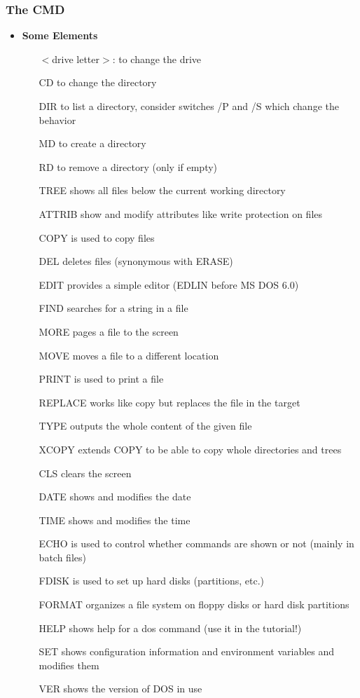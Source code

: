 \documentclass[twocolumn]{article}
\begin{document}
		\subsubsection{The CMD}
			\begin{itemize}
				\item \textbf{Some Elements}
			\begin{itemize}
		\item[$<$drive letter$>$:] to change the drive
		\item[CD] to change the directory
		\item[DIR] to list a directory, consider switches /P and /S which change the behavior
		\item[MD] to create a directory
		\item[RD] to remove a directory (only if empty)
		\item[TREE] shows all files below the current working directory
		\item[ATTRIB] show and modify attributes like write protection on files
		\item[COPY] is used to copy files
		\item[DEL] deletes files (synonymous with ERASE)
		\item[EDIT] provides a simple editor (EDLIN before MS DOS 6.0)
		\item[FIND] searches for a string in a file
		\item[MORE] pages a file to the screen	
		\item[MOVE] moves a file to a different location
		\item[PRINT] is used to print a file
		\item[REPLACE] works like copy but replaces the file in the target
		\item[TYPE] outputs the whole content of the given file
		\item[XCOPY] extends COPY to be able to copy whole directories and trees
		\item[CLS] clears the screen
		\item[DATE] shows and modifies the date
		\item[TIME] shows and modifies the time
		\item[ECHO ]is used to control whether commands are shown or not (mainly in batch files)
		\item[FDISK] is used to set up hard disks (partitions, etc.)
		\item[FORMAT] organizes a file system on floppy disks or hard disk partitions
		\item[HELP ]shows help for a dos command (use it in the tutorial!)
		\item[SET ]shows configuration information and environment variables and modifies them
		\item[VER] shows the version of DOS in use
			\end{itemize}
			\end{itemize}
\end{document}
